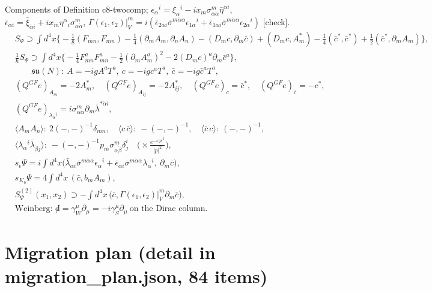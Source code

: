 \documentclass[11pt]{article}
\theoremstyle{plain}
\theoremstyle{definition}
\numberwithin{equation}{section}
\begin{document}
Components of Definition c8-twocomp; $\epsilon_\alpha{}^i=\xi_\alpha{}^i-ix_m\sigma^m_{\alpha\dot\alpha}\bar\eta^{\dot\alpha i}$, $\bar\epsilon_{\dot\alpha i}=\bar\xi_{\dot\alpha i}+ix_m\eta^\alpha{}_i\sigma^m_{\alpha\dot\alpha}$, $\Gamma(\epsilon_1,\epsilon_2)|_V^m=i(\bar\epsilon_{2\dot\alpha i}\bar\sigma^{m\dot\alpha\alpha}\epsilon_{1\alpha}{}^i+\bar\epsilon_{1\dot\alpha i}\bar\sigma^{m\dot\alpha\alpha}\epsilon_{2\alpha}{}^i)$ [check].
\[
\begin{aligned}
&S_\Psi\supset\int d^4x\Big\{-\tfrac18(F_{mn},F_{mn})-\tfrac14(\partial_mA_m,\partial_nA_n)-(D_mc,\partial_m\bar c)+(D_mc,A^*_m)-\tfrac14(\bar c^*,\bar c^*)+\tfrac12(\bar c^*,\partial_mA_m)\Big\},\\
&\tfrac1\hbar S_\Psi\supset\int d^4x\Big\{-\tfrac14F^a_{mn}F^a_{mn}-\tfrac12(\partial_mA^a_m)^2-2(D_mc)^a\partial_m\bar c^a\Big\},\\
&\qquad\mathfrak{su}(N):\ A=-igA^aT^a,\ c=-igc^aT^a,\ \bar c=-ig\bar c^aT^a,\\
&(Q^{GF}e)_{A_m}=-2A^*_m,\quad (Q^{GF}e)_{A_{ij}}=-2A^*_{ij},\quad (Q^{GF}e)_c=\bar c^*,\quad (Q^{GF}e)_{\bar c}=-c^*,\\
&(Q^{GF}e)_{\lambda_\alpha{}^i}=i\sigma^m_{\alpha\dot\alpha}\partial_m\bar\lambda^{*\dot\alpha i},\\
&\langle A_mA_n\rangle:\ 2(-,-)^{-1}\delta_{mn},\quad \langle c\,\bar c\rangle:\ -(-,-)^{-1},\quad \langle\bar c\,c\rangle:\ (-,-)^{-1},\\
&\langle\lambda_\alpha{}^i\bar\lambda_{\dot\beta j}\rangle:\ -(-,-)^{-1}p_m\sigma^m_{\alpha\dot\beta}\delta^i_j\quad\Big(\times\tfrac{e^{-\varepsilon|p|^2}}{|p|^2}\Big),\\
&s_\epsilon\Psi=i\int d^4x\big(\bar\lambda_{\dot\alpha i}\bar\sigma^{m\dot\alpha\alpha}\epsilon_\alpha{}^i+\bar\epsilon_{\dot\alpha i}\bar\sigma^{m\dot\alpha\alpha}\lambda_\alpha{}^i,\ \partial_m\bar c\big),\\
&s_{K_b}\Psi=4\int d^4x\,(\bar c,b_mA_m),\\
&S^{(2)}_\Psi(x_1,x_2)\supset-\int d^4x\,\big(\bar c,\Gamma(\epsilon_1,\epsilon_2)|_V^m\partial_m\bar c\big),\\
&\text{Weinberg: }{\not d}=\gamma^\mu_W\partial_\mu=-i\gamma^\mu_S\partial_\mu\ \text{on the Dirac column}.
\end{aligned}
\]

\section{Migration plan (detail in migration\_plan.json, 84 items)}
\end{document}

